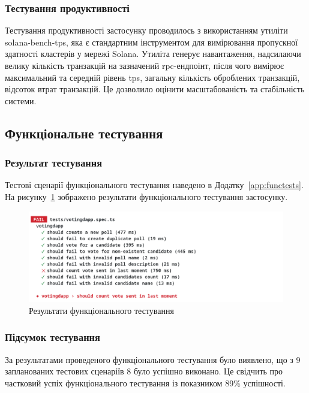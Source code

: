 \documentclass[14pt]{extreport}
\begin{document}
  \subsubsection{Тестування продуктивності}
  
  Тестування продуктивності застосунку проводилось з використанням утиліти sol\-ana-bench-tps, яка є стандартним інструментом для вимірювання пропускної здатності кластерів у мережі Solana. Утиліта генерує навантаження, надсилаючи велику кількість транзакцій на зазначений \gls{rpc}-ендпоінт, після чого вимірює максимальний та середній рівень \gls{tps}, загальну кількість оброблених транзакцій, відсоток втрат транзакцій. Це дозволило оцінити масштабованість та стабільність системи.
  
  \subsection{Функціональне тестування}
  
  \subsubsection*{Результат тестування}
  
  Тестові сценарії функціонального тестування наведено в Додатку~\ref{app:functests}. На рисунку~\ref{fig:functests} зображено результати функціонального тестування застосунку.

  \begin{figure}[H]
    \centering
    \includegraphics[width=\textwidth]{FuncTests}
    \caption{Результати функціонального тестування}
    \label{fig:functests}
  \end{figure}
  
  \subsubsection*{Підсумок тестування}
  
  За результатами проведеного функціонального тестування було виявлено, що з 9 запланованих тестових сценаріїв 8 було успішно виконано. Це свідчить про частковий успіх функціонального тестування із показником 89\% успішності.
  
\end{document}
